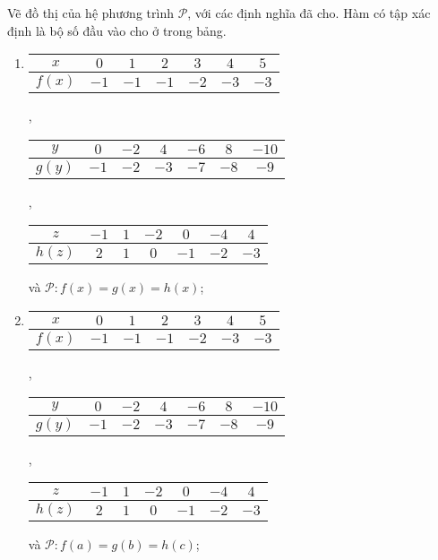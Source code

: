 \exercise[ex:hpt1] Vẽ đồ thị của hệ phương trình $\mathcal{P}$, với các định nghĩa đã cho. Hàm có tập xác định là bộ số đầu vào cho ở trong bảng.
\begin{enumerate}
   \item 
   \begin{tabular}{|c|c|c|c|c|c|c|}
      \hline
      $x$ & $0$ & $1$ & $2$ & $3$ & $4$ & $5$ \\
      \hline
      $f(x)$ & $-1$ & $-1$ & $-1$ & $-2$ & $-3$ & $-3$\\
      \hline
   \end{tabular},
   \begin{tabular}{|c|c|c|c|c|c|c|}
      \hline
      $y$ & $0$ & $-2$ & $4$ & $-6$ & $8$ & $-10$\\
      \hline
      $g(y)$ & $-1$ & $-2$ & $-3$ & $-7$ & $-8$ & $-9$\\
      \hline
   \end{tabular},

   \noindent\begin{tabular}{|c|c|c|c|c|c|c|}
      \hline
      $z$ & $-1$ & $1$ & $-2$ & $0$ & $-4$ & $4$\\
      \hline
      $h(z)$ & $2$ & $1$ & $0$ & $-1$ & $-2$ & $-3$\\
      \hline
   \end{tabular} và $\mathcal{P}:f(x) = g(x) = h(x)$;

   \item
   \begin{tabular}{|c|c|c|c|c|c|c|}
      \hline
      $x$ & $0$ & $1$ & $2$ & $3$ & $4$ & $5$ \\
      \hline
      $f(x)$ & $-1$ & $-1$ & $-1$ & $-2$ & $-3$ & $-3$\\
      \hline
   \end{tabular},
   \begin{tabular}{|c|c|c|c|c|c|c|}
      \hline
      $y$ & $0$ & $-2$ & $4$ & $-6$ & $8$ & $-10$\\
      \hline
      $g(y)$ & $-1$ & $-2$ & $-3$ & $-7$ & $-8$ & $-9$\\
      \hline
   \end{tabular},

   \noindent\begin{tabular}{|c|c|c|c|c|c|c|}
      \hline
      $z$ & $-1$ & $1$ & $-2$ & $0$ & $-4$ & $4$\\
      \hline
      $h(z)$ & $2$ & $1$ & $0$ & $-1$ & $-2$ & $-3$\\
      \hline
   \end{tabular} và $\mathcal{P}:f(a) = g(b) = h(c)$;


\end{enumerate}
